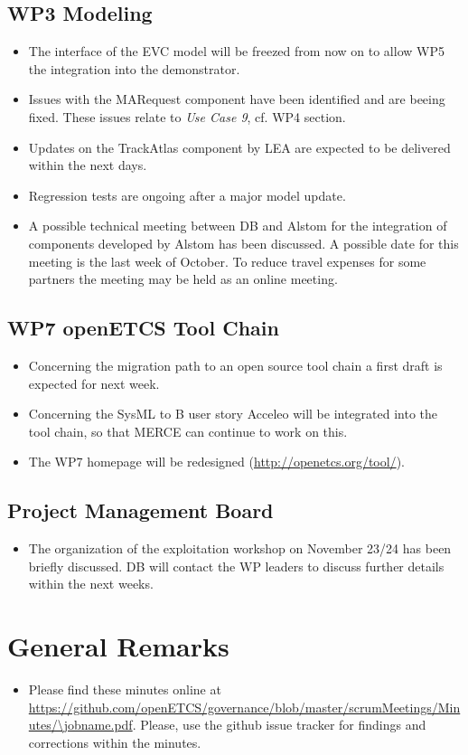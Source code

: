 \documentclass[a4paper, 11pt]{article}
\begin{document}
\subsection{WP3 Modeling}
\begin{itemize}
\item The interface of the EVC model will be freezed from now on to allow WP5 the integration into the demonstrator.
\item Issues with the MARequest component have been identified and are beeing fixed. These issues relate to \emph{Use Case 9}, cf. WP4 section.
\item Updates on the TrackAtlas component by LEA are expected to be delivered within the next days.
\item Regression tests are ongoing after a major model update.
\item A possible technical meeting between DB and Alstom for the integration of components developed by Alstom has been discussed. A possible date for this meeting is the last week of October. To reduce travel expenses for some partners the meeting may be held as an online meeting.
\end{itemize}

\subsection{WP7 openETCS Tool Chain}
\begin{itemize}
\item Concerning the migration path to an open source tool chain a first draft is expected for next week.
\item Concerning the SysML to B user story Acceleo will be integrated into the tool chain, so that MERCE can continue to work on this.
\item The WP7 homepage will be redesigned (\url{http://openetcs.org/tool/}).
\end{itemize}

\subsection{Project Management Board}
\begin{itemize}
\item The organization of the exploitation workshop on November 23/24 has been briefly discussed. DB will contact the WP leaders to discuss further details within the next weeks.
\end{itemize}

\section{General Remarks}

\begin{itemize}
\item Please find these minutes online at \url{https://github.com/openETCS/governance/blob/master/scrumMeetings/Minutes/\jobname.pdf}. Please, use the github issue tracker for findings and corrections within the minutes.
\end{itemize}
\end{document}
